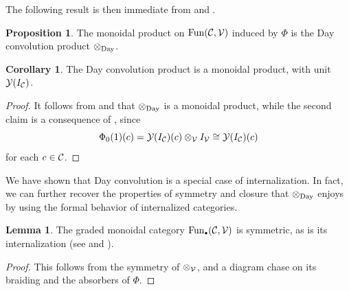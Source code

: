 \documentclass[openany, amssymb, psamsfonts]{amsart}
\theoremstyle{definition}
\newtheorem{cor}{Corollary}[section]
\newtheorem{prop}{Proposition}[section]
\newtheorem{lem}{Lemma}[section]
\numberwithin{equation}{section}
\begin{document}
The following result is then immediate from  and .

\begin{prop}\label{prop:day_is_internalization}
The monoidal product on $\operatorname{Fun}(\mathcal{C}, \mathcal{V})$ induced by $\Phi$ is the Day convolution product $\otimes_{\mathrm{Day}}$.
\end{prop}

\begin{cor}
The Day convolution product is a monoidal product, with unit $\mathcal{Y}(I_{\mathcal{C}})$.
\end{cor}
\begin{proof}
It follows from  and  that $\otimes_{\mathrm{Day}}$ is a monoidal product, while the second claim is a consequence of , since
\begin{equation*}
    \Phi_0(1)(c) = \mathcal{Y}(I_{\mathcal{C}})(c) \otimes_{\mathcal{V}} I_{\mathcal{V}} \cong \mathcal{Y}(I_{\mathcal{C}})(c)
\end{equation*} for each $c \in \mathcal{C}$.
\end{proof}

We have shown that Day convolution is a special case of internalization. In fact, we can further recover the properties of symmetry and closure that $\otimes_{\mathrm{Day}}$ enjoys by using the formal behavior of internalized categories.

\begin{lem}
The graded monoidal category $\Fun_\sbull(\C, \V)$ is symmetric, as is its internalization (see  and ).
\end{lem}
\begin{proof}
This follows from the symmetry of $\otimes_{\mathcal{V}}$, and a diagram chase on its braiding and the absorbers of $\Phi$.
\end{proof}
\end{document}
